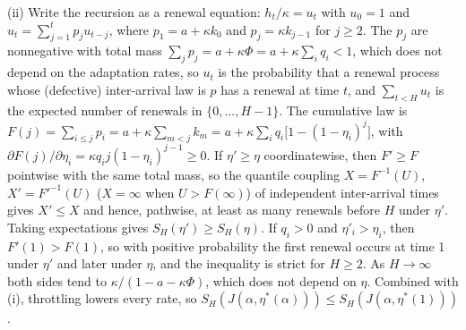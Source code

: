 (ii) Write the recursion as a renewal equation: $h_t/\kappa=u_t$ with $u_0=1$ and $u_t=\sum_{j=1}^tp_ju_{t-j}$, where $p_1=a+\kappa k_0$ and $p_j=\kappa k_{j-1}$ for $j\ge2$. The $p_j$ are nonnegative with total mass $\sum_jp_j=a+\kappa\Phi=a+\kappa\sum_iq_i<1$, which does not depend on the adaptation rates, so $u_t$ is the probability that a renewal process whose (defective) inter-arrival law is $p$ has a renewal at time $t$, and $\sum_{t<H}u_t$ is the expected number of renewals in $\{0,\ldots,H-1\}$. The cumulative law is $F(j)=\sum_{i\le j}p_i=a+\kappa\sum_{m<j}k_m=a+\kappa\sum_iq_i\bigl[1-(1-\eta_i)^j\bigr]$, with $\partial F(j)/\partial\eta_i=\kappa q_ij(1-\eta_i)^{j-1}\ge0$. If $\eta'\ge\eta$ coordinatewise, then $F'\ge F$ pointwise with the same total mass, so the quantile coupling $X=F^{-1}(U)$, $X'=F'^{-1}(U)$ ($X=\infty$ when $U>F(\infty)$) of independent inter-arrival times gives $X'\le X$ and hence, pathwise, at least as many renewals before $H$ under $\eta'$. Taking expectations gives $S_H(\eta')\ge S_H(\eta)$. If $q_i>0$ and $\eta'_i>\eta_i$, then $F'(1)>F(1)$, so with positive probability the first renewal occurs at time 1 under $\eta'$ and later under $\eta$, and the inequality is strict for $H\ge2$. As $H\to\infty$ both sides tend to $\kappa/(1-a-\kappa\Phi)$, which does not depend on $\eta$. Combined with (i), throttling lowers every rate, so $S_H(J(\alpha,\eta^*(\alpha)))\le S_H(J(\alpha,\eta^*(1)))$.

